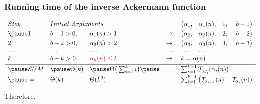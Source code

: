 \begin{frame}
\frametitle{Running time of the inverse Ackermann function}

\pause
\begin{equation*}
\begin{array}{l|llllllll}
Step & \multicolumn{2}{l}{Initial \ Arguments} &  &  \big(\alpha_1, & \alpha_1(n), & 1, & b - 1 \big) \\[3pt]
\pause 1 & b - 1 > 0, & \alpha_1(n) > 1 & \to & \big(\alpha_2, & \alpha_2(n), & 2, & b - 2\big) \\[3pt]
2 & b - 2 > 0, & \alpha_2(n) > 2 & \to  & \big(\alpha_3, & \alpha_3(n), & 3, & b - 3\big) \\
\cdots & \cdots &\cdots & \cdots & \cdots & \cdots & \cdots \\
k & b - k > 0, & {\color{red} \alpha_{k}(n) \le k} & \to  & \multicolumn{4}{l}{k = \alpha(n)} \\[3pt] \hline
\pause SUM & \pause \Theta(k) & \pause \Theta\big(\sum_{i=1}^{k}i\big) \pause & & \multicolumn{4}{l}{\sum_{i=1}^{k-1} \runtime_{\cdt{\alpha_i}{1}} (\alpha_i(n))} \\[3pt]
\pause = & \Theta(k) & \Theta(k^2) & & \multicolumn{4}{l}{\sum_{i=1}^{k-1} \big(\runtime_{\alpha_{i+1}}(n) - \runtime_{\alpha_i}(n) \big)}
\end{array}
\end{equation*}

\smallskip

\pause
Therefore, 

\end{frame}